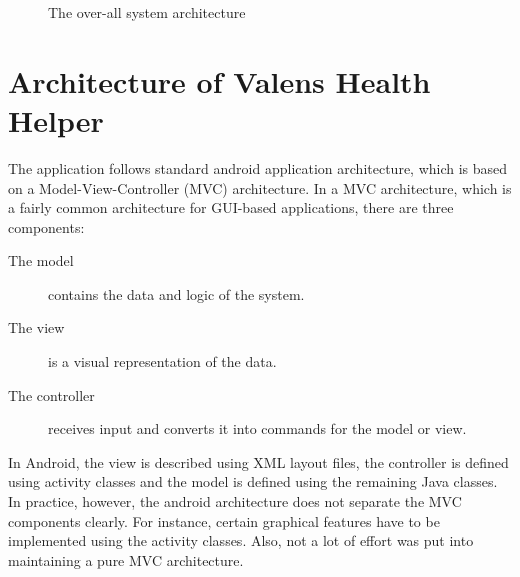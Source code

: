 \begin{figure}[p]

\setlength\fboxsep{0pt}
\setlength\fboxrule{1pt}\noindent{}

\caption{The over-all system architecture}
\label{fig:Architecture}
\end{figure}


\section{Architecture of Valens Health Helper}
The application follows standard android application architecture, which is based on a Model-View-Controller (MVC) architecture. In a MVC architecture, which is a fairly common architecture for GUI-based applications, there are three components:

\begin{description}
\item[The model] contains the data and logic of the system.
\item[The view] is a visual representation of the data. 
\item[The controller] receives input and converts it into commands for the model or view. 
\end{description}

In Android, the view is described using XML layout files, the controller is defined using activity classes and the model is defined using the remaining Java classes. In practice, however, the android architecture does not separate the MVC components clearly. For instance, certain graphical features have to be implemented using the activity classes. Also, not a lot of effort was put into maintaining a pure MVC architecture.%

